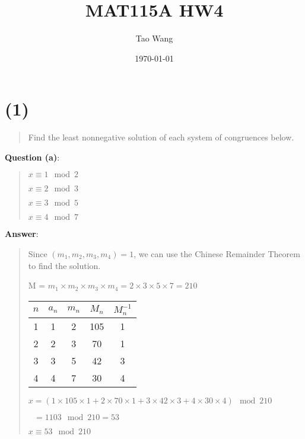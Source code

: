 \documentclass{article} %
\begin{document}
\title{MAT115A HW4}
\author{Tao Wang}
\date{\today}

\maketitle
\section*{(1) }
\begin{quote}
    Find the least nonnegative solution of each system of congruences below.
\end{quote}

\bigskip
\noindent
\textbf{Question (a)}:

\begin{quote}
    $x \equiv 1 \mod 2$

    $x \equiv 2 \mod 3$

    $x \equiv 3 \mod 5$

    $x \equiv 4 \mod 7$
\end{quote}

\bigskip
\noindent
\textbf{Answer}:
\bigskip
\begin{quote}

    Since $(m_1, m_2, m_3, m_4) = 1$, we can use the Chinese Remainder Theorem to find the solution.


    M = $m_1 \times m_2 \times m_3 \times m_4 = 2 \times 3 \times 5 \times 7 = 210$
    \bigskip

    \begin{tabular}{|c|c|c|c|c|}
        \hline
        $n$ & $a_n$ & $m_n$ & $M_n$ & $M_n^{-1}$ \\
        \hline
        1   & 1     & 2     & 105   & 1          \\
        \hline
        2   & 2     & 3     & 70    & 1          \\
        \hline
        3   & 3     & 5     & 42    & 3          \\
        \hline
        4   & 4     & 7     & 30    & 4          \\
        \hline
    \end{tabular}

    \bigskip

    $x = (1 \times 105 \times 1 + 2 \times 70 \times 1 + 3 \times 42 \times 3 + 4 \times 30 \times 4) \mod 210$

    $ \text{  }= 1103 \mod 210 = 53$

    $\boxed{x \equiv 53 \mod 210}$

\end{quote}
\end{document}
